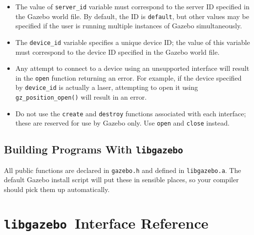 \documentclass[11pt]{report}
\def\libgazebo {{\tt libgazebo}~}
\begin{document}
  \begin{itemize}
  \item The value of {\tt server\_id} variable must correspond to the
  server ID specified in the Gazebo world file.  By default, the ID
  is {\tt default}, but other values may be specified if the user is
  running multiple instances of Gazebo simultaneously.
  \item The {\tt device\_id} variable specifies a unique device ID; the
  value of this variable must correspond to the device ID specified in
  the Gazebo world file.
  \item Any attempt to connect to a device using an unsupported
  interface will result in the {\tt open} function returning an error.
  For example, if the device specified by {\tt device\_id} is actually a 
  laser, attempting to open it using {\tt gz\_position\_open()} will result in
  an error.
  \item Do not use the {\tt create} and {\tt destroy} functions
  associated with each interface; these are reserved for use by
  Gazebo only.  Use {\tt open} and {\tt close} instead.
  \end{itemize}

\section{Building Programs With \libgazebo}

All public functions are declared in {\tt gazebo.h} and defined in
{\tt libgazebo.a}.  The default Gazebo install script will put these
in sensible places, so your compiler should pick them up automatically.


%


\chapter{\libgazebo Interface Reference}
\label{chap.libgazebo.ref}
\end{document}
